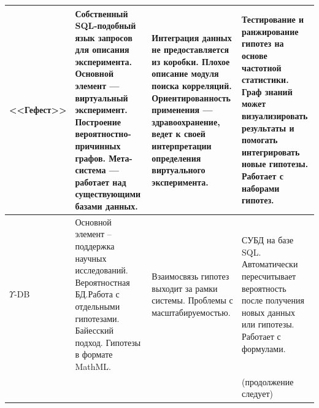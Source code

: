\begin{table} [ht]
\begin{tabulary}{\textwidth}{@{}>{\zz}L >{\zz}L >{\zz}L >{\zz}L@{}}
        \\
        \midrule %
        <<Гефест>> &
        Собственный SQL-подобный язык запросов для описания эксперимента. Основной элемент --- виртуальный эксперимент. 
        Построение вероятностно-причинных графов. Мета-система --- работает над существующими базами данных. &
        Интеграция данных не предоставляется из коробки. Плохое описание модуля поиска корреляций. 
        Ориентированность применения --- здравоохранение, ведет к своей 
        интерпретации определения виртуального эксперимента. &
        Тестирование и ранжирование гипотез на основе частотной статистики.
        Граф знаний может визуализировать результаты и помогать интегрировать новые гипотезы. 
        Работает с наборами гипотез.
        \\
        \midrule
        $\Upsilon$-DB &
        Основной элемент – поддержка научных исследований. Вероятностная БД.Работа с отдельными гипотезами.
        Байесский подход. Гипотезы в формате MathML. &
        Взаимосвязь гипотез выходит за рамки системы. Проблемы с масштабируемостью. &
        СУБД на базе SQL. Автоматически пересчитывает вероятность после получения новых данных или гипотезы. 
        Работает с формулами.
        \\
        \midrule
        & &  & \scriptsize (продолжение следует)
        \\
        \bottomrule %
	\end{tabulary}%
\end{table}

